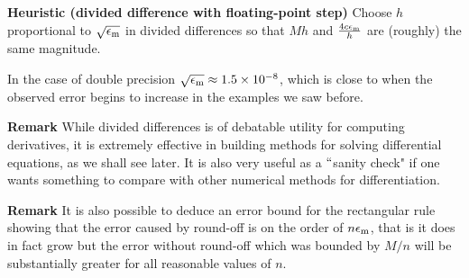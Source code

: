 \textbf{Heuristic (divided difference with floating-point step)} Choose $h$ proportional to $\sqrt{\ensuremath{\epsilon}_{\rm m}}$ in divided differences  so that $M h$ and ${4c \ensuremath{\epsilon}_{\rm m} \over h}$ are (roughly) the same magnitude.

In the case of double precision $\sqrt{\ensuremath{\epsilon}_{\rm m}} \ensuremath{\approx} 1.5\ensuremath{\times} 10^{-8}$, which is close to when the observed error begins to increase in the examples we saw before.

\textbf{Remark} While divided differences is of debatable utility for computing derivatives, it is extremely effective in building methods for solving differential equations, as we shall see later. It is also very useful as a \ensuremath{\ldq}sanity check" if one wants something to compare with other numerical methods for differentiation.

\textbf{Remark} It is also possible to deduce an error bound for the rectangular rule showing that the error caused by round-off is on the order of $n \ensuremath{\epsilon}_{\rm m}$, that is it does in fact grow but the error without round-off which was bounded by $M/n$ will be substantially greater for all reasonable values of $n$.



